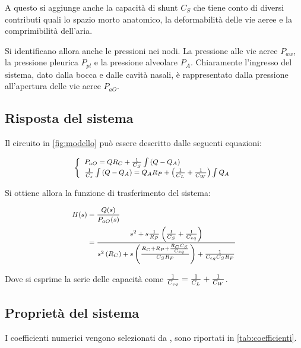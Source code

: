 A questo si aggiunge anche la capacità di shunt $C_S$ che tiene conto di diversi contributi quali lo spazio morto anatomico, la deformabilità delle vie aeree e la comprimibilità dell'aria. 

Si identificano allora anche le pressioni nei nodi. La pressione alle vie aeree $P_{aw}$, la pressione pleurica $P_{pl}$ e la pressione alveolare $P_A$. Chiaramente l'ingresso del sistema, dato dalla bocca e dalle cavità nasali, è rappresentato dalla pressione all'apertura delle vie aeree $P_{aO}$. 



\subsection{Risposta del sistema}

Il circuito in \cref{fig:modello} può essere descritto dalle seguenti equazioni:

\begin{equation}
	\footnotesize{
	\left\{\begin{array}{l}
		P_{a O}=Q R_{C}+\frac{1}{C_{S}} \int\left(Q-Q_{A}\right) \\
		\frac{1}{C_{s}} \int\left(Q-Q_{A}\right)=Q_{A} R_{P}+\left(\frac{1}{C_{L}}+\frac{1}{C_{W}}\right) \int Q_{A}
	\end{array}\right.}
\end{equation}

Si ottiene allora la funzione di trasferimento del sistema:

\begin{equation}
		\footnotesize{
\begin{aligned}
	H(s)&=\frac{Q(s)}{P_{a O}(s)}\\
	&=\frac{s^{2}+s \frac{1}{R_{P}}\left(\frac{1}{C_{S}}+\frac{1}{C_{e q}}\right)}{s^{2}\left(R_{C}\right)+s\left(\frac{R_{C}+R_{P}+\frac{R_{C} C_{S}}{C_{e q}}}{C_{S} R_{P}}\right)+\frac{1}{C_{e q} C_{S} R_{P}}}
\end{aligned}}
\end{equation}

Dove si esprime la serie delle capacità come ${1\over C_{eq}}={1\over C_{L}}+{1\over C_{W}}$. 

\subsection{Proprietà del sistema}

I coefficienti numerici vengono selezionati da \citeauthor{khoo_physiological_2018} \cite{khoo_physiological_2018}, sono riportati in \cref{tab:coefficienti}.


